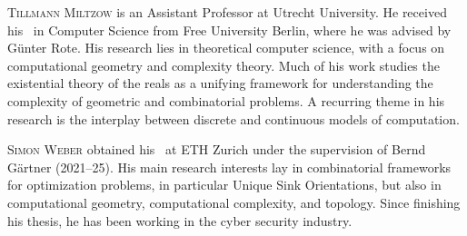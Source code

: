 \documentclass{toc}
\begin{document}
\begin{tocaboutauthors}
\begin{tocabout}[miltzow]
  \textsc{Tillmann Miltzow} is an Assistant Professor at Utrecht University. He received his 
\phd\ in Computer Science from Free University Berlin, where he was advised by G{\"u}nter Rote.
His research lies in theoretical computer science, with a focus on computational geometry and
complexity theory. Much of his work studies the existential theory of the reals as a unifying
framework for understanding the complexity of geometric and combinatorial problems. A recurring
theme in his research is the interplay between discrete and continuous models of computation.
\end{tocabout}
\begin{tocabout}[weber]  %
\textsc{Simon Weber} obtained his \phd\ at ETH Zurich under the supervision of Bernd
G{\"a}rtner (2021--25). His main research interests %
lay  %
in combinatorial frameworks for optimization problems, in particular Unique Sink Orientations,
but also in computational geometry, computational complexity, and topology. Since finishing his thesis, he
%
%
%
%
has been working %
in the cyber security industry.
\end{tocabout}
\end{tocaboutauthors}
\end{document}
